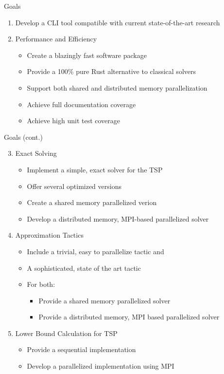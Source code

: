 

\begin{frame}{Goals}
  \begin{enumerate}
    \item Develop a CLI tool compatible with current state-of-the-art research
    \pause
    \item Performance and Efficiency
      \begin{itemize}
        \item Create a blazingly fast software package
        \item Provide a 100\% pure Rust alternative to classical solvers
        \item Support both shared and distributed memory parallelization
        \item Achieve full documentation coverage
        \item Achieve high unit test coverage
      \end{itemize}
  \end{enumerate}
\end{frame}
\begin{frame}{Goals (cont.)}
  \begin{enumerate}
      \setcounter{enumi}{2}
    \item Exact Solving
      \begin{itemize}
        \item Implement a simple, exact solver for the TSP
        \item Offer several optimized versions
        \item Create a shared memory parallelized verion
        \item Develop a distributed memory, MPI-based parallelized solver
      \end{itemize}
      \pause
    \item Approximation Tactics
      \begin{itemize}
        \item Include a trivial, easy to parallelize tactic and
        \item A sophisticated, state of the art tactic
        \item For both:
          \begin{itemize}
            \item Provide a shared memory parallelized solver
            \item Provide a distributed memory, MPI based parallelized solver
          \end{itemize}
      \end{itemize}
      \pause
    \item Lower Bound Calculation for TSP
      \begin{itemize}
        \item Provide a sequential implementation
        \item Develop a parallelized implementation using MPI
      \end{itemize}
  \end{enumerate}
\end{frame}


